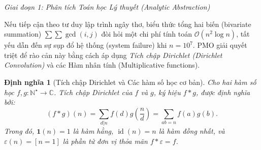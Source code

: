 \documentclass{article}
\newtheorem{dinhnghia}{Định nghĩa}
\begin{document}
\vspace{0.5em}\noindent\emph{Giai đoạn 1: Phân tích Toán học Lý thuyết (Analytic Abstraction)}

Nếu tiếp cận theo tư duy lập trình ngây thơ, biểu thức tổng hai biến (bivariate summation) $\sum \sum \gcd(i, j)$ đòi hỏi một chi phí tính toán $\mathcal{O}(n^2 \log n)$, tất yếu dẫn đến sự sụp đổ hệ thống (system failure) khi $n = 10^7$. PMO giải quyết triệt để rào cản này bằng cách áp dụng \textit{Tích chập Dirichlet (Dirichlet Convolution)} và các Hàm nhân tính (Multiplicative functions).

\begin{dinhnghia}[Tích chập Dirichlet và Các hàm số học cơ bản]
Cho hai hàm số học $f, g: \mathbb{N}^\star \to \mathbb{C}$. Tích chập Dirichlet của $f$ và $g$, ký hiệu $f * g$, được định nghĩa bởi:
\begin{equation*}
 (f * g)(n) = \sum_{d | n} f(d) g\left(\frac{n}{d}\right) = \sum_{ab = n} f(a) g(b).
\end{equation*}
Trong đó, $\mathbf{1}(n) = 1$ là hàm hằng, $\operatorname{id}(n) = n$ là hàm đồng nhất, và $\varepsilon(n) = [n = 1]$ là phần tử đơn vị thỏa mãn $f * \varepsilon = f$.
\end{dinhnghia}
\end{document}

